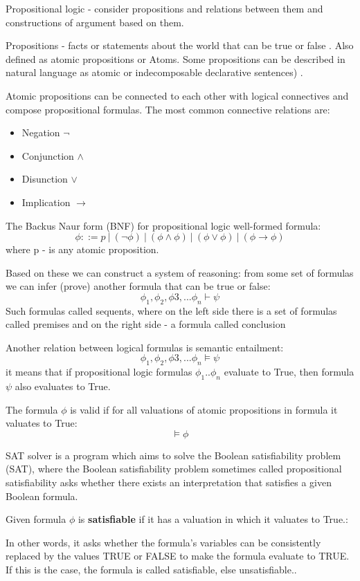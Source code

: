 Propositional logic - consider  propositions and relations between them and 
constructions of argument based on them.

Propositions - facts or statements about the world  that can be true or false
. Also defined as atomic propositions or Atoms.
Some propositions can be described in natural language as atomic or indecomposable 
declarative sentences) \cite{HuthR1}.


Atomic propositions can be connected to each other with logical connectives and compose propositional formulas.
The most common connective relations are:
\begin{itemize}
    \item Negation $ \neg $
    \item Conjunction $ \land $ 
    \item Disunction $ \lor $ 
    \item Implication $ \rightarrow $
\end{itemize}

The Backus Naur form (BNF) for propositional logic well-formed formula:
\[ \phi ::= p\ |\ (\neg \phi)\ |\ (\phi \land \phi)\ |\ (\phi\lor\phi)\ |\ (\phi\rightarrow\phi)    \]
where p - is any atomic proposition.

Based on these we can construct a system of reasoning: from some set of formulas we can infer (prove) another formula that can be true or false:
\[ \phi_1, \phi_2, \phi3, ... \phi_n \vdash \psi \]
Such formulas called sequents, where on the left side there is a set of formulas called premises and on the right side - a formula called conclusion


Another relation between logical formulas  is semantic entailment:
\[ \phi_1, \phi_2, \phi3, ... \phi_n \models \psi \]
it means that if propositional logic formulas $\phi_1 .. \phi_n$ evaluate to True, then formula $\psi$ also evaluates to True.

The formula $\phi$ is valid if for all valuations of atomic propositions in formula it valuates to True:
\[ \models \phi \]


SAT solver is a program which aims to solve the Boolean satisfiability problem 
(SAT), where the Boolean satisfiability problem sometimes called 
propositional satisfiability asks whether there 
exists an interpretation that satisfies a given Boolean formula. 

Given formula  $\phi$ is \textbf{satisfiable} if it has a valuation in which it valuates to True.:

In other words, it asks whether the formula's variables can be 
consistently replaced by the values TRUE or FALSE to make the formula 
evaluate to TRUE. If this is the case, the formula is called satisfiable, 
else unsatisfiable.\cite{HuthR1}.

